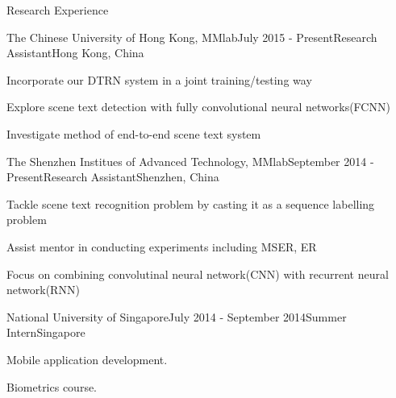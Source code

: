 \documentclass{resume} %
\begin{document}

\begin{rSection}{Research Experience}

\begin{rSubsection}{The Chinese University of Hong Kong, MMlab}{July 2015 - Present}{Research Assistant}{Hong Kong, China}
\item Incorporate our DTRN system in a joint training/testing way
\item Explore scene text detection with fully convolutional neural networks(FCNN)
\item Investigate method of end-to-end scene text system 
\end{rSubsection}


\begin{rSubsection}{The Shenzhen Institues of Advanced Technology, MMlab}{September 2014 - Present}{Research Assistant}{Shenzhen, China}
\item Tackle scene text recognition problem by casting it as a sequence labelling problem
\item Assist mentor in conducting experiments including MSER, ER
\item Focus on combining convolutinal neural network(CNN) with recurrent neural network(RNN)
\end{rSubsection}


\begin{rSubsection}{National University of Singapore}{July 2014 - September 2014}{Summer Intern}{Singapore}
\item Mobile application development.
\item Biometrics course. 
\\
\end{rSubsection}

\end{rSection}

\end{document}
